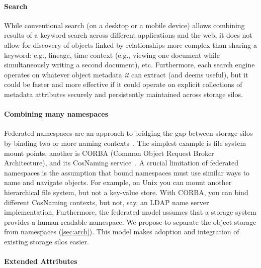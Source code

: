 \paragraph{Search} While conventional search (on a desktop or a mobile device) allows combining results of 
a keyword search across different applications and the web, it does not allow for discovery of objects linked
by relationships more complex than sharing a keyword: e.g., lineage, time context (e.g., viewing one document
while simultaneously writing a second document), etc. 
Furthermore, each search engine operates on whatever object metadata \textit{it} can extract (and deems useful), 
but it could be faster and more effective if it could operate on explicit collections of metadata attributes securely and 
persistently maintained across storage silos. %

\paragraph{Combining many namespaces}

Federated namespaces are an approach to bridging the gap between storage silos by binding two or more naming contexts~\cite{namespace-federation-ibm, huawei, kubernetes, cloudera, netapp-patent}. 
The simplest example is file system mount points, another is CORBA (Common Object Request Broker Architecture), and its CosNaming service~\cite{cos-naming-oracle, omg-naming}. 
A crucial limitation of federated namespaces is the assumption that bound namespaces must use similar ways to name and navigate objects. 
For example, on Unix you can mount another hierarchical file system, but not a key-value store. With CORBA, you can bind different CosNaming contexts, but not, say, an LDAP name server implementation. 
Furthermore, the federated model assumes that a storage system provides a human-readable namespace. 
We propose to separate the object storage from namespaces (\autoref{sec:arch}). This model makes adoption and integration of existing storage silos easier.

\paragraph{Extended Attributes}


